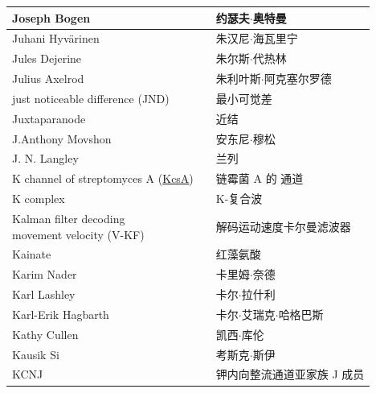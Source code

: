 \begin{longtable}{lll}
	\midrule
	Joseph Bogen   && 约瑟夫$\cdot$奥特曼  \\
	
	\midrule
	Juhani Hyvärinen   && 朱汉尼$\cdot$海瓦里宁  \\
	
	\midrule
	Jules Dejerine   && 朱尔斯$\cdot$代热林  \\
	
	\midrule
	Julius Axelrod   && 朱利叶斯$\cdot$阿克塞尔罗德  \\
	
	\midrule
	just noticeable difference (JND)   && 最小可觉差  \\
	
	\midrule
	Juxtaparanode   && 近结  \\
	
	\midrule
	J.Anthony Movshon   && 安东尼$\cdot$穆松  \\
	
	\midrule
	J. N. Langley   && 兰列  \\
	
	\midrule
	K channel of streptomyces A (\href{https://en.wikipedia.org/wiki/KcsA_potassium_channel}{KcsA})  && 链霉菌 A 的 \ce{K+} 通道  \\
	
	\midrule
	K complex   && K-复合波  \\
	
	\midrule
	\makecell[l]{Kalman filter decoding \\movement velocity (V-KF)}   && 解码运动速度卡尔曼滤波器  \\
	
	\midrule
	Kainate   && 红藻氨酸  \\
	
	\midrule
	Karim Nader   && 卡里姆$\cdot$奈德  \\
	
	\midrule
	Karl Lashley  && 卡尔$\cdot$拉什利  \\
	
	\midrule
	Karl-Erik Hagbarth  && 卡尔$\cdot$艾瑞克$\cdot$哈格巴斯  \\
	
	\midrule
	Kathy Cullen  && 凯西$\cdot$库伦  \\
	
	\midrule
	Kausik Si  && 考斯克$\cdot$斯伊  \\
	
	\midrule
	KCNJ   && 钾内向整流通道亚家族 J 成员  \\
	

\end{longtable}
